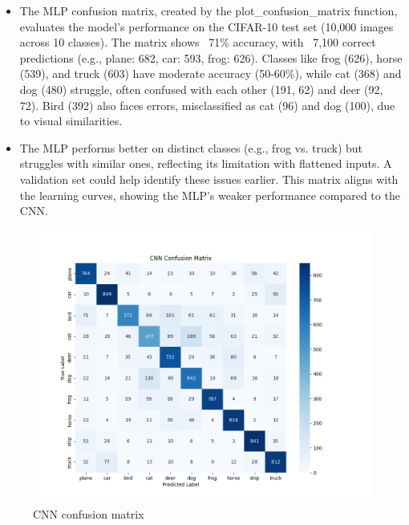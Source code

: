 \documentclass[a4paper,12pt]{article}
\begin{document}
\begin{itemize}
    \item The MLP confusion matrix, created by the plot\_confusion\_matrix function, evaluates the model’s performance on the CIFAR-10 test set (10,000 images across 10 classes). The matrix shows ~71\% accuracy, with ~7,100 correct predictions (e.g., plane: 682, car: 593, frog: 626). Classes like frog (626), horse (539), and truck (603) have moderate accuracy (50-60\%), while cat (368) and dog (480) struggle, often confused with each other (191, 62) and deer (92, 72). Bird (392) also faces errors, misclassified as cat (96) and dog (100), due to visual similarities. 
    
    \item The MLP performs better on distinct classes (e.g., frog vs. truck) but struggles with similar ones, reflecting its limitation with flattened inputs. A validation set could help identify these issues earlier. This matrix aligns with the learning curves, showing the MLP’s weaker performance compared to the CNN.
\end{itemize}
\newpage

\begin{figure}[h]
    \centering
    \includegraphics[width=0.9\linewidth]{images/cnn_confusion_matrix.png}
    \caption{CNN confusion matrix}
    \label{fig:enter-label}
\end{figure}
\end{document}
